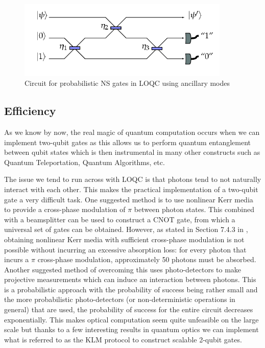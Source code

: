 \begin{figure}[H]
    \centering
    \includegraphics[width=0.9\textwidth]{images/NS gate.png}
    \caption{Circuit for probabilistic NS gates in LOQC using ancillary modes}\label{fig:NS_gate}
\end{figure}



\subsection{Efficiency}
As we know by now, the real magic of quantum computation occurs when we can implement two-qubit gates as this allows us to perform quantum entanglement between qubit states which is then instrumental in many other constructs such as Quantum Teleportation, Quantum Algorithms, etc.

The issue we tend to run across with LOQC is that photons tend to not naturally interact with each other. This makes the practical implementation of a two-qubit gate a very difficult task. One suggested method is to use nonlinear Kerr media to provide a cross-phase modulation of $\pi$ between photon states. This combined with a beamsplitter can be used to construct a CNOT gate, from which a universal set of gates can be obtained. However, as stated in Section 7.4.3 in \cite{nielsen_chuang_2010}, obtaining nonlinear Kerr media with sufficient cross-phase modulation is not possible without incurring an excessive absorption loss: for every photon that incurs a $\pi$ cross-phase modulation, approximately 50 photons must be absorbed. Another suggested method of overcoming this uses photo-detectors to make projective measurements which can induce an interaction between photons\cite{Kok:2005jip}. This is a probabilistic approach with the probability of success being rather small and the more probabilistic photo-detectors (or non-deterministic operations in general) that are used, the probability of success for the entire circuit decreases exponentially. This makes optical computation seem quite unfeasible on the large scale but thanks to a few interesting results in quantum optics we can implement what is referred to as the KLM protocol to construct scalable 2-qubit gates.

